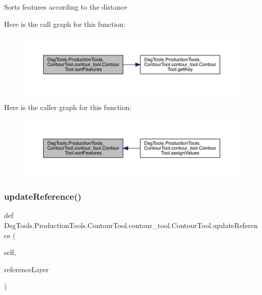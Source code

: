 \begin{DoxyVerb}Sorts features according to the distance
\end{DoxyVerb}
 Here is the call graph for this function\+:
\nopagebreak
\begin{figure}[H]
\begin{center}
\leavevmode
\includegraphics[width=350pt]{class_dsg_tools_1_1_production_tools_1_1_contour_tool_1_1contour__tool_1_1_contour_tool_a01bdbd09cc15fe60b49d1f351e810c23_cgraph}
\end{center}
\end{figure}
Here is the caller graph for this function\+:
\nopagebreak
\begin{figure}[H]
\begin{center}
\leavevmode
\includegraphics[width=350pt]{class_dsg_tools_1_1_production_tools_1_1_contour_tool_1_1contour__tool_1_1_contour_tool_a01bdbd09cc15fe60b49d1f351e810c23_icgraph}
\end{center}
\end{figure}
\mbox{\label{class_dsg_tools_1_1_production_tools_1_1_contour_tool_1_1contour__tool_1_1_contour_tool_a6a7b5ead3d76e267b30cfff2dec155c1}} 
\subsubsection{\texorpdfstring{update\+Reference()}{updateReference()}}
{\footnotesize\ttfamily def Dsg\+Tools.\+Production\+Tools.\+Contour\+Tool.\+contour\+\_\+tool.\+Contour\+Tool.\+update\+Reference (\begin{DoxyParamCaption}\item[{}]{self,  }\item[{}]{reference\+Layer }\end{DoxyParamCaption})}

